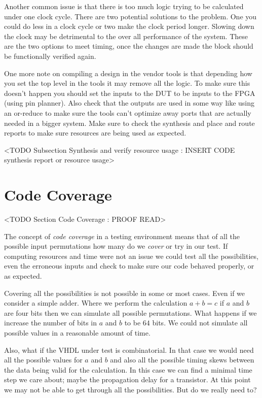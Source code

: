 Another common issue is that there is too much logic trying to be calculated under one clock cycle. There are two potential solutions to the problem. One you could do less in a clock cycle or two make the clock period longer. Slowing down the clock may be detrimental to the over all performance of the system. These are the two options to meet timing, once the changes are made the block should be functionally verified again.  

One more note on compiling a design in the vendor tools is that depending how you set the top level in the tools it may remove all the logic. To make sure this doesn't happen you should set the inputs to the \ac{DUT} to be inputs to the FPGA (using pin planner). Also check that the outputs are used in some way like using an or-reduce to make sure the tools can't optimize away ports that are actually needed in a bigger system. Make sure to check the synthesis and place and route reports to make sure resources are being used as expected. 
	
	<TODO Subsection Synthesis and verify resource usage : INSERT CODE synthesis report or resource usage>
	
\section{Code Coverage}
	<TODO Section Code Coverage : PROOF READ>
	
The concept of \emph{code coverage} in a testing environment means that of all the possible input permutations how many do we \emph{cover} or try in our test. If computing resources and time were not an issue we could test all the possibilities, even the erroneous inputs and check to make sure our code behaved properly, or as expected. 

Covering all the possibilities is not possible in some or most cases. Even if we consider a simple adder. Where we perform the calculation $a+b=c$ if $a$ and $b$ are four bits then we can simulate all possible permutations. What happens if we increase the number of bits in $a$ and $b$ to be $64$ bits. We could not simulate all possible values in a reasonable amount of time.

Also, what if the \ac{VHDL} under test is combinatorial. In that case we would need all the possible values for $a$ and $b$ and also all the possible timing skews between the data being valid for the calculation. In this case we can find a minimal time step we care about; maybe the propagation delay for a transistor. At this point we may not be able to get through all the possibilities. But do we really need to?

